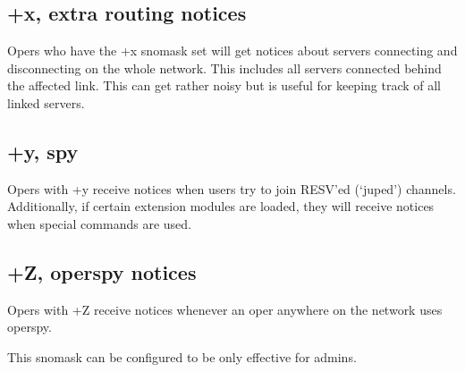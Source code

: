 \subsection{+x, extra routing notices}

	Opers who have the +x snomask set will get notices about servers
	connecting and disconnecting on the whole network. This includes all
	servers connected behind the affected link. This can get rather noisy
	but is useful for keeping track of all linked servers.


\subsection{+y, spy}

	Opers with +y receive notices when users try to join RESV'ed (`juped')
	channels. Additionally, if certain extension modules are loaded, they
	will receive notices when special commands are used.


\subsection{+Z, operspy notices}

	Opers with +Z receive notices whenever an oper anywhere on the network
	uses operspy.
 
	This snomask can be configured to be only effective for admins.
